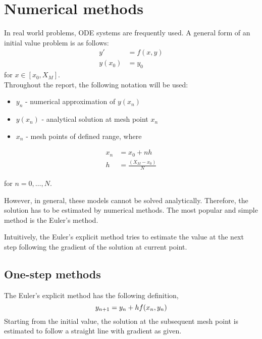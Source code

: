 \chapter{Numerical methods}
\label{chap:numerical-methods}
In real world problems, ODE systems are frequently used. A general form of an initial value problem is as follows: 
\begin{align}
    y'&=f(x,y)\\
    y(x_0) &= y_0
\end{align}
for $x \in [x_0, X_M]$. \\

Throughout the report, the following notation will be used:
\begin{itemize}
    \item $y_n$ - numerical approximation of $y(x_n)$
    \item $y(x_n)$ - analytical solution at mesh point $x_n$
    \item $x_n$ - mesh points of defined range, where
\end{itemize}

\begin{align}
    x_n &= x_0 + nh\\
    h &= \frac{(X_M - x_0)}{N}
\end{align}

for $n = 0,\dots, N$.

However, in general, these models cannot be solved analytically. Therefore, the solution has to be estimated by numerical methods. The most popular and simple method is the Euler's method.

Intuitively, the Euler's explicit method tries to estimate the value at the next step following the gradient of the solution at current point.

\section{One-step methods}
\label{sec:one-step-method}
The Euler's explicit method has the following definition,  
\begin{equation}
    y_{n+1} = y_n + hf(x_n,y_n)\\
\end{equation}
Starting from the initial value, the solution at the subsequent mesh point is estimated to follow a straight line with gradient as given.

